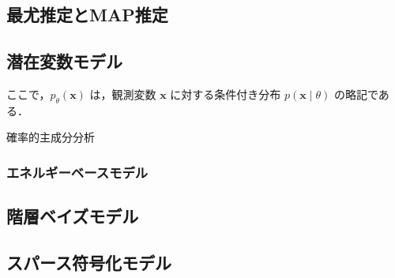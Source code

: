 \documentclass[titlepage]{ltjsbook}
\begin{document}
\subsection{最尤推定とMAP推定}

\subsection{潜在変数モデル}
ここで，$p_\theta(\mathbf{x})$ は，観測変数 $\mathbf{x}$ に対する条件付き分布 $p(\mathbf{x} \mid \theta)$ の略記である．

確率的主成分分析
\subsubsection{エネルギーベースモデル}

\subsection{階層ベイズモデル}

\subsection{スパース符号化モデル}
\end{document}
